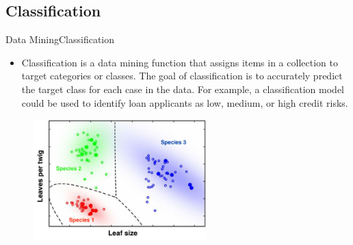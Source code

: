 \documentclass[10pt]{beamer}
\begin{document}
\subsection{Classification}
\begin{frame}{Data Mining}{Classification}
\begin{itemize}
\item Classification is a data mining function that assigns items in a collection to target categories or classes. The goal of classification is to accurately predict the target class for each case in the data. For example, a classification model could be used to identify loan applicants as low, medium, or high credit risks.


\end{itemize}
\begin{figure}[H]
	\centering
	\includegraphics[width=0.6\textwidth]{images/Classification.jpg}
 
\end{figure}

\end{frame}
\end{document}

